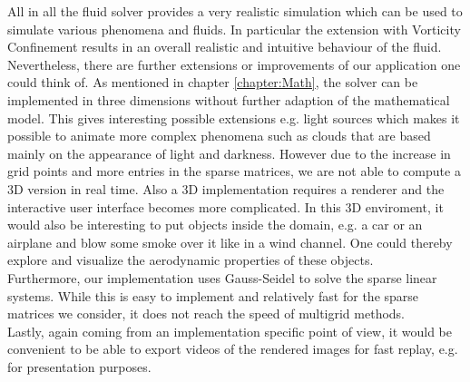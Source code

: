 \documentclass[a4paper,10pt,oneside,final,german,openbib,pdftex,titlepage]{scrbook}
\begin{document}
All in all the fluid solver provides a very realistic simulation which can be used to simulate various phenomena and fluids. In particular the extension with Vorticity Confinement results in an overall realistic and intuitive behaviour of the fluid.\\

Nevertheless, there are further extensions or improvements of our application one could think of. As mentioned in chapter \ref{chapter:Math}, the solver can be implemented in three dimensions without further adaption of the mathematical model. This gives interesting possible extensions e.g. light sources which makes it possible to animate more complex phenomena such as clouds that are based mainly on the appearance of light and darkness. However due to the increase in grid points and more entries in the sparse matrices, we are not able to compute a 3D version in real time. Also a 3D implementation requires a renderer and the interactive user interface becomes more complicated. In this 3D enviroment, it would also be interesting to put objects inside the domain, e.g. a car or an airplane and blow some smoke over it like in a wind channel. One could thereby explore and visualize the aerodynamic properties of these objects.\\

Furthermore, our implementation uses Gauss-Seidel to solve the sparse linear systems. While this is easy to implement and relatively fast for the sparse matrices we consider, it does not reach the speed of multigrid methods.\\

Lastly, again coming from an implementation specific point of view, it would be convenient to be able to export videos of the rendered images for fast replay, e.g. for presentation purposes.
%

\end{document}
